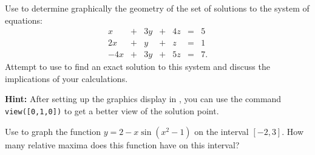 \documentclass{ximera}
\begin{document}
\begin{exercise} \label{c2.2.4}
Use \Matlab to determine graphically the geometry of the set of
solutions to the system of equations:
\[
\begin{array}{rcrcrcr}
  x & + & 3y & + & 4z  & = & 5\\
 2x & + &  y & + &  z  & = & 1\\
-4x & + & 3y & + & 5z  & = & 7.
\end{array}
\]
Attempt to use \Matlab to find an exact solution to this system
and discuss the implications of your calculations.

{\bf Hint:} After setting up the graphics display in \Matlabp,
you can use the command {\tt view([0,1,0])}  to get
a better view of the solution point.
\end{exercise}

\begin{exercise} \label{c2.2.a5}
Use \Matlab to graph the function $y = 2 - x\sin(x^2-1)$ on the interval
$[-2,3]$.  How many relative maxima does this function have on this interval?
\end{exercise}
\end{document}
